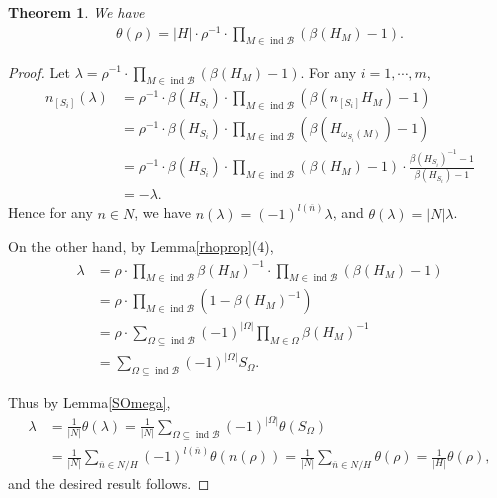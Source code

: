 \documentclass[12pt]{amsart}
\newtheorem{theorem}{Theorem}[section]
\begin{document}
\begin{theorem}
    We have 
    \begin{align*}
        \theta(\rho) = |H|\cdot \rho^{-1} \cdot \prod_{M\in \operatorname{ind}\mathcal{B}}(\beta(H_M)-1).
    \end{align*}
\end{theorem}

\begin{proof}
    Let $\lambda = \rho^{-1} \cdot \prod_{M\in \operatorname{ind}\mathcal{B}}(\beta(H_M)-1)$.
    For any $i=1,\cdots,m$, 
    \begin{align*}
        n_{[S_i]}(\lambda) &= \rho^{-1} \cdot \beta(H_{S_i}) \cdot \prod_{M\in \operatorname{ind}\mathcal{B}}(\beta(n_{[S_i]}H_M)-1) \\
            &= \rho^{-1} \cdot \beta(H_{S_i}) \cdot \prod_{M\in \operatorname{ind}\mathcal{B}}(\beta(H_{\omega_{S_i}(M)})-1) \\
            &=\rho^{-1} \cdot \beta(H_{S_i}) \cdot \prod_{M\in \operatorname{ind}\mathcal{B}}(\beta(H_M)-1) \cdot \frac{\beta(H_{S_i})^{-1}-1}{\beta(H_{S_i})-1} \\
            &=-\lambda.
    \end{align*}
    Hence for any $n\in N$, we have $n(\lambda) = (-1)^{l(\overline{n})}\lambda$, and $\theta(\lambda) = |N|\lambda$.

    On the other hand, by Lemma\ref{rhoprop}(4), 
    \begin{align*}
        \lambda &= \rho \cdot \prod_{M\in \operatorname{ind}\mathcal{B}} \beta(H_M)^{-1} \cdot \prod_{M\in \operatorname{ind}\mathcal{B}}(\beta(H_M)-1) \\
         &= \rho \cdot \prod_{M\in \operatorname{ind}\mathcal{B}}(1-\beta(H_M)^{-1}) \\
         &= \rho \cdot \sum_{\Omega \subseteq \operatorname{ind}\mathcal{B}} (-1)^{|\Omega|} \prod_{M\in \Omega} \beta(H_M)^{-1} \\
         &= \sum_{\Omega\subseteq \operatorname{ind}\mathcal{B}} (-1)^{|\Omega|} S_{\Omega}.
    \end{align*}

    Thus by Lemma\ref{SOmega}, 
    \begin{align*}
        \lambda &= \frac{1}{|N|} \theta(\lambda) = \frac{1}{|N|} \sum_{\Omega \subseteq \operatorname{ind}\mathcal{B}} (-1)^{|\Omega|} \theta(S_{\Omega}) \\
        &=\frac{1}{|N|} \sum_{\overline{n}\in N/H} (-1)^{l(\overline{n})} \theta(n(\rho)) = \frac{1}{|N|} \sum_{\overline{n}\in N/H} \theta(\rho)  = \frac{1}{|H|} \theta(\rho),
    \end{align*}    
    and the desired result follows.
\end{proof}
\end{document}
